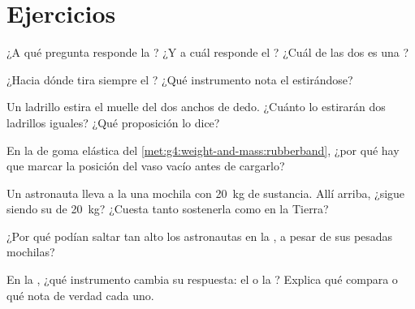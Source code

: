 \section{Ejercicios}

\begin{exercise}[$\star$]\label{exo:g4:weight-and-mass:1}
¿A qué pregunta responde la ? ¿Y a cuál responde el ?
¿Cuál de las dos es una ?
\end{exercise}

\begin{exercise}[$\star$]\label{exo:g4:weight-and-mass:2}
¿Hacia dónde tira siempre el ? ¿Qué instrumento nota el 
estirándose?
\end{exercise}

\begin{exercise}[$\star$]\label{exo:g4:weight-and-mass:3}
Un ladrillo estira el muelle del  dos anchos de dedo.
¿Cuánto lo estirarán dos ladrillos iguales? ¿Qué proposición lo dice?
\end{exercise}

\begin{exercise}[$\star$]\label{exo:g4:weight-and-mass:4}
En la  de goma elástica del
\cref{met:g4:weight-and-mass:rubberband}, ¿por qué hay que marcar la
posición del vaso vacío antes de cargarlo?
\end{exercise}

\begin{exercise}[$\star$]\label{exo:g4:weight-and-mass:5}
Un astronauta lleva a la  una mochila con \qty{20}{kg} de
sustancia. Allí arriba, ¿sigue siendo su  de \qty{20}{kg}?
¿Cuesta tanto sostenerla como en la Tierra?
\end{exercise}

\begin{exercise}[$\star$]\label{exo:g4:weight-and-mass:6}
¿Por qué podían saltar tan alto los astronautas en la , a pesar
de sus pesadas mochilas?
\end{exercise}

\begin{exercise}[$\star$]\label{exo:g4:weight-and-mass:7}
En la , ¿qué instrumento cambia su respuesta: el
 o la ? Explica qué compara o qué nota de
verdad cada uno.
\end{exercise}

